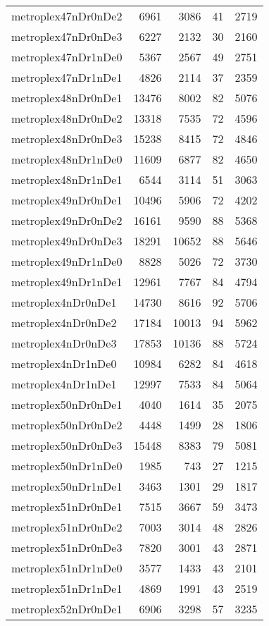 \begin{longtable}{lrrrr}
metroplex47nDr0nDe2 & 6961 & 3086 & 41 & 2719 \\
metroplex47nDr0nDe3 & 6227 & 2132 & 30 & 2160 \\
metroplex47nDr1nDe0 & 5367 & 2567 & 49 & 2751 \\
metroplex47nDr1nDe1 & 4826 & 2114 & 37 & 2359 \\
metroplex48nDr0nDe1 & 13476 & 8002 & 82 & 5076 \\
metroplex48nDr0nDe2 & 13318 & 7535 & 72 & 4596 \\
metroplex48nDr0nDe3 & 15238 & 8415 & 72 & 4846 \\
metroplex48nDr1nDe0 & 11609 & 6877 & 82 & 4650 \\
metroplex48nDr1nDe1 & 6544 & 3114 & 51 & 3063 \\
metroplex49nDr0nDe1 & 10496 & 5906 & 72 & 4202 \\
metroplex49nDr0nDe2 & 16161 & 9590 & 88 & 5368 \\
metroplex49nDr0nDe3 & 18291 & 10652 & 88 & 5646 \\
metroplex49nDr1nDe0 & 8828 & 5026 & 72 & 3730 \\
metroplex49nDr1nDe1 & 12961 & 7767 & 84 & 4794 \\
metroplex4nDr0nDe1 & 14730 & 8616 & 92 & 5706 \\
metroplex4nDr0nDe2 & 17184 & 10013 & 94 & 5962 \\
metroplex4nDr0nDe3 & 17853 & 10136 & 88 & 5724 \\
metroplex4nDr1nDe0 & 10984 & 6282 & 84 & 4618 \\
metroplex4nDr1nDe1 & 12997 & 7533 & 84 & 5064 \\
metroplex50nDr0nDe1 & 4040 & 1614 & 35 & 2075 \\
metroplex50nDr0nDe2 & 4448 & 1499 & 28 & 1806 \\
metroplex50nDr0nDe3 & 15448 & 8383 & 79 & 5081 \\
metroplex50nDr1nDe0 & 1985 & 743 & 27 & 1215 \\
metroplex50nDr1nDe1 & 3463 & 1301 & 29 & 1817 \\
metroplex51nDr0nDe1 & 7515 & 3667 & 59 & 3473 \\
metroplex51nDr0nDe2 & 7003 & 3014 & 48 & 2826 \\
metroplex51nDr0nDe3 & 7820 & 3001 & 43 & 2871 \\
metroplex51nDr1nDe0 & 3577 & 1433 & 43 & 2101 \\
metroplex51nDr1nDe1 & 4869 & 1991 & 43 & 2519 \\
metroplex52nDr0nDe1 & 6906 & 3298 & 57 & 3235 \\

\end{longtable}
